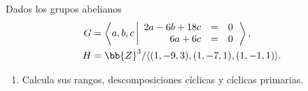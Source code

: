 \begin{ejercicio}\label{ej:7.11}
    Dados los grupos abelianos
    \begin{align*}
        G &= \left\langle a, b, c \left|
            \begin{array}{rcl}
                2a - 6b + 18c &=& 0 \\
                6a + 6c &=& 0
            \end{array}
        \right.\right\rangle,\\
        H &= \bb{Z}^3/\langle(1, -9, 3),(1, -7, 1),(1, -1, 1)\rangle.
    \end{align*}
    \begin{enumerate}
        \item Calcula sus rangos, descomposiciones cíclicas y cíclicas primarias.
        

\end{enumerate}
\end{ejercicio}
